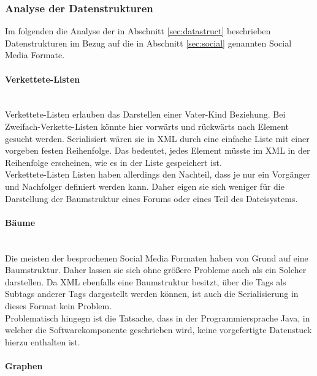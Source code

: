 \documentclass[a4paper]{article}
\begin{document}
	\subsubsection{Analyse der Datenstrukturen}
	
	Im folgenden die Analyse der in  Abschnitt \ref{sec:datastruct} beschrieben
	Datenstrukturen im Bezug auf die in Abschnitt \ref{sec:social} genannten
	Social Media Formate.
	
	\paragraph{Verkettete-Listen}\mbox{} \\
	
	Verkettete-Listen erlauben das Darstellen einer Vater-Kind Beziehung. Bei
	Zweifach-Verkette-Listen könnte hier vorwärts und rückwärts nach Element
	gesucht werden. Serialisiert wären sie in XML durch eine einfache Liste
	mit einer vorgeben festen Reihenfolge. Das bedeutet, jedes Element müsste
	im XML in der Reihenfolge erscheinen, wie es in der Liste gespeichert ist. \\
	
	Verkettete-Listen Listen haben allerdings den Nachteil, dass je nur ein
	Vorgänger und Nachfolger definiert werden kann. Daher eigen sie sich weniger
	für die Darstellung der Baumstruktur eines Forums oder eines Teil des
	Dateisystems. 	
	
	\paragraph{Bäume}\mbox{} \\
	
	Die meisten der besprochenen Social Media Formaten haben von Grund auf eine
	Baumstruktur. Daher lassen sie sich ohne größere Probleme auch als ein
	Solcher darstellen. Da XML ebenfalls eine Baumstruktur besitzt, über
	die Tags als Subtags anderer Tags dargestellt werden können, ist auch
	die Serialisierung in dieses Format kein Problem. \\
	
	Problematisch hingegn ist die Tatsache, dass in der Programmiersprache 
	Java, in welcher die Softwarekomponente geschrieben wird, keine vorgefertigte
	Datenstuck hierzu enthalten ist.
	
	\paragraph{Graphen}\mbox{} \\
	
\end{document}

